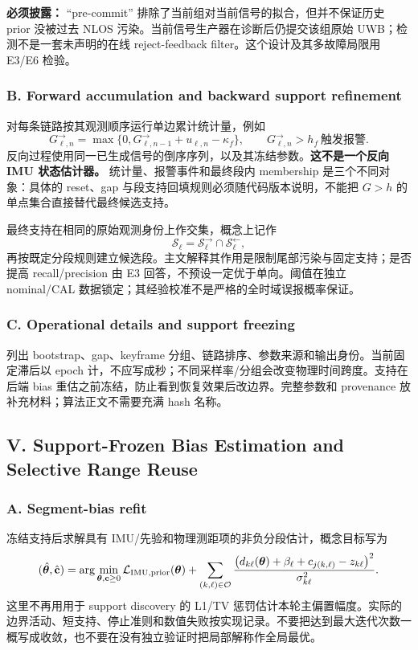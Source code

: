 \documentclass[UTF8,fontset=fandol,11pt,a4paper]{ctexart}
\begin{document}
\textbf{必须披露：} ``pre-commit'' 排除了当前组对当前信号的拟合，但并不保证历史 prior 没被过去 NLOS 污染。当前信号生产器在诊断后仍提交该组原始 UWB；检测不是一套未声明的在线 reject-feedback filter。这个设计及其多故障局限用 E3/E6 检验。\cite{provider}

\subsubsection{B. Forward accumulation and backward support refinement}
对每条链路按其观测顺序运行单边累计统计量，例如
\begin{equation}
 G^{\rightarrow}_{\ell,n}=
 \max\{0,G^{\rightarrow}_{\ell,n-1}+u_{\ell,n}-\kappa_f\},
 \qquad G^{\rightarrow}_{\ell,n}>h_f\ \text{触发报警}.
 \label{eq:cusum}
\end{equation}
反向过程使用同一已生成信号的倒序序列，以及其冻结参数。\textbf{这不是一个反向 IMU 状态估计器。} 统计量、报警事件和最终段内 membership 是三个不同对象：具体的 reset、gap 与段支持回填规则必须随代码版本说明，不能把 \(G>h\) 的单点集合直接替代最终候选支持。\cite{provider}

最终支持在相同的原始观测身份上作交集，概念上记作
\begin{equation}
 \mathcal S_\ell=\mathcal S^{\rightarrow}_\ell\cap
                  \mathcal S^{\leftarrow}_\ell,
\end{equation}
再按既定分段规则建立候选段。主文解释其作用是限制尾部污染与固定支持；是否提高 recall/precision 由 E3 回答，不预设一定优于单向。阈值在独立 nominal/CAL 数据锁定；其经验校准不是严格的全时域误报概率保证。

\subsubsection{C. Operational details and support freezing}
列出 bootstrap、gap、keyframe 分组、链路排序、参数来源和输出身份。当前固定滞后以 epoch 计，不应写成秒；不同采样率/分组会改变物理时间跨度。支持在后端 bias 重估之前冻结，防止看到恢复效果后改边界。完整参数和 provenance 放补充材料；算法正文不需要充满 hash 名称。

\subsection{V. Support-Frozen Bias Estimation and Selective Range Reuse}

\subsubsection{A. Segment-bias refit}
冻结支持后求解具有 IMU/先验和物理测距项的非负分段估计，概念目标写为
\begin{equation}
 (\hat{\bm\theta},\hat{\mathbf c})=
 \arg\min_{\bm\theta,\mathbf c\geq0}
 \mathcal L_{\rm IMU,prior}(\bm\theta)+
 \sum_{(k,\ell)\in\mathcal O}
 \frac{\big(d_{k\ell}(\bm\theta)+\beta_\ell+c_{j(k,\ell)}-z_{k\ell}\big)^2}
 {\sigma_{k\ell}^2}.
 \label{eq:refit}
\end{equation}
这里不再用用于 support discovery 的 L1/TV 惩罚估计本轮主偏置幅度。实际的边界活动、短支持、停止准则和数值失败按实现记录。不要把达到最大迭代次数一概写成收敛，也不要在没有独立验证时把局部解称作全局最优。
\end{document}
